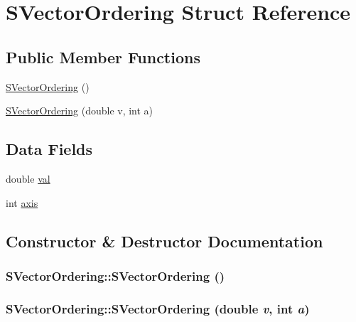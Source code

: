 \hypertarget{structSVectorOrdering}{
\section{SVectorOrdering Struct Reference}
\label{structSVectorOrdering}
}
\subsection*{Public Member Functions}
\begin{DoxyCompactItemize}
\item 
\hyperlink{structSVectorOrdering_aef207024322a7d0937fb11991c44c4de}{SVectorOrdering} ()
\item 
\hyperlink{structSVectorOrdering_ad17f17f5bda3b5cd125fcdfdcad0572a}{SVectorOrdering} (double v, int a)
\end{DoxyCompactItemize}
\subsection*{Data Fields}
\begin{DoxyCompactItemize}
\item 
double \hyperlink{structSVectorOrdering_ac3340f979d692941003ee73bc3c76a71}{val}
\item 
int \hyperlink{structSVectorOrdering_a4e626e681f4dcdbdec76bd5890f89ec2}{axis}
\end{DoxyCompactItemize}


\subsection{Constructor \& Destructor Documentation}
\hypertarget{structSVectorOrdering_aef207024322a7d0937fb11991c44c4de}{
\subsubsection[{SVectorOrdering}]{\setlength{\rightskip}{0pt plus 5cm}SVectorOrdering::SVectorOrdering ()}}
\label{structSVectorOrdering_aef207024322a7d0937fb11991c44c4de}
\hypertarget{structSVectorOrdering_ad17f17f5bda3b5cd125fcdfdcad0572a}{
\subsubsection[{SVectorOrdering}]{\setlength{\rightskip}{0pt plus 5cm}SVectorOrdering::SVectorOrdering (double {\em v}, \/  int {\em a})}}
\label{structSVectorOrdering_ad17f17f5bda3b5cd125fcdfdcad0572a}


